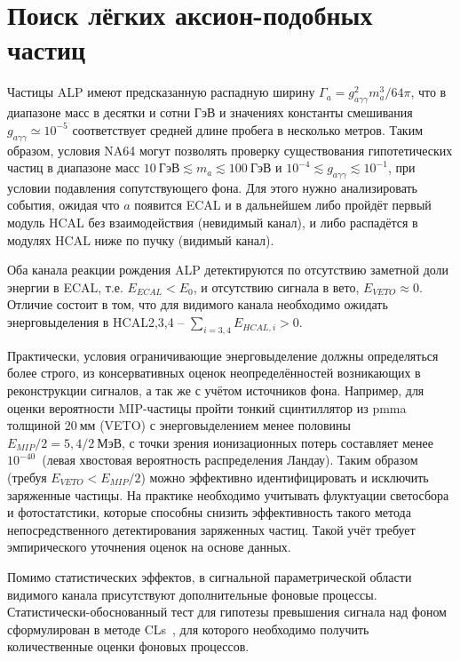 \section{Поиск лёгких аксион-подобных частиц}

Частицы ALP имеют предсказанную распадную ширину
$\Gamma_{a} = g^2_{a\gamma\gamma} m_a^3 / 64 \pi$, что
в диапазоне масс в десятки и сотни ГэВ и значениях константы
смешивания $g_{a\gamma\gamma} \simeq10^{-5}$ соответствует
средней длине пробега в несколько метров. Таким образом,
условия NA64 могут позволять проверку существования гипотетических
частиц в диапазоне масс $10~\text{ГэВ} \lesssim m_a \lesssim 100~\text{ГэВ}$
и $10^{-4}\lesssim g_{a\gamma\gamma} \lesssim10^{-1}$, при условии
подавления сопутствующего фона.
Для этого нужно анализировать события, ожидая что
$a$ появится ECAL и в дальнейшем либо пройдёт первый модуль HCAL без
взаимодействия (невидимый канал), и либо распадётся в модулях HCAL ниже
по пучку (видимый канал).

Оба канала реакции рождения ALP детектируются по
отсутствию заметной доли энергии в ECAL, т.е. $E_{ECAL} < E_0$,
и отсутствию сигнала в вето, $E_{VETO} \approx 0$. Отличие состоит
в том, что для видимого канала необходимо ожидать энерговыделения
в HCAL2,3,4 -- $\sum\limits_{i = 3,4} E_{HCAL,i} > 0$.

Практически, условия ограничивающие энерговыделение должны определяться более
строго, из консервативных оценок неопределённостей возникающих
в реконструкции сигналов, а так же с учётом источников фона.
Например, для оценки вероятности MIP-частицы пройти тонкий
сцинтиллятор из \acrshort{pmma} толщиной $20~\text{мм}$ (VETO) с энерговыделением
менее половины $E_{MIP}/2 = 5{,}4/2~\text{МэВ}$, с точки зрения ионизационных
потерь составляет менее $10^{-40}$~(левая хвостовая вероятность распределения
Ландау). Таким образом (требуя $E_{VETO} < E_{MIP}/2$) можно
эффективно идентифицировать и исключить заряженные частицы. На
практике необходимо учитывать флуктуации светосбора и фотостатстики,
которые способны снизить эффективность такого метода непосредственного
детектирования заряженных частиц.
Такой учёт требует эмпирического уточнения оценок на основе данных.

Помимо статистических эффектов, в сигнальной параметрической области
видимого канала присутствуют дополнительные фоновые
процессы. Статистически-обоснованный
тест для гипотезы превышения сигнала над фоном сформулирован в методе
CLs~\cite{read-cls}, для которого необходимо получить количественные
оценки фоновых процессов.

